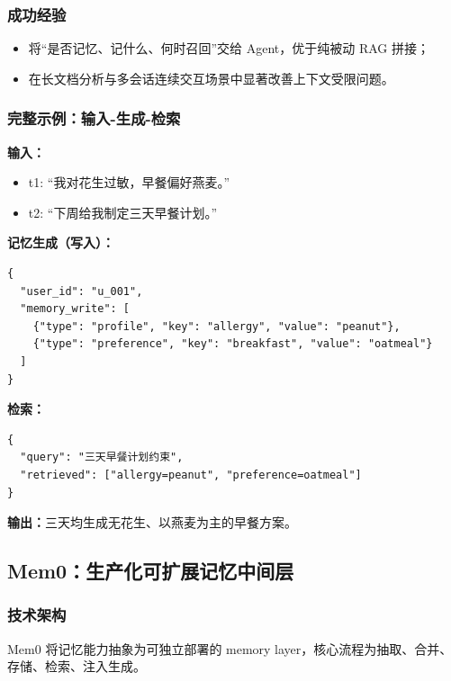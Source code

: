 \documentclass[12pt,a4paper]{article}
\begin{document}
\subsubsection{成功经验}
\begin{itemize}[leftmargin=2em]
  \item 将“是否记忆、记什么、何时召回”交给 Agent，优于纯被动 RAG 拼接；
  \item 在长文档分析与多会话连续交互场景中显著改善上下文受限问题\cite{memgpt2024}。
\end{itemize}

\subsubsection{完整示例：输入-生成-检索}
\textbf{输入：}
\begin{itemize}[leftmargin=2em]
  \item t1: “我对花生过敏，早餐偏好燕麦。”
  \item t2: “下周给我制定三天早餐计划。”
\end{itemize}

\textbf{记忆生成（写入）：}
\begin{verbatim}
{
  "user_id": "u_001",
  "memory_write": [
    {"type": "profile", "key": "allergy", "value": "peanut"},
    {"type": "preference", "key": "breakfast", "value": "oatmeal"}
  ]
}
\end{verbatim}

\textbf{检索：}
\begin{verbatim}
{
  "query": "三天早餐计划约束",
  "retrieved": ["allergy=peanut", "preference=oatmeal"]
}
\end{verbatim}

\textbf{输出：}三天均生成无花生、以燕麦为主的早餐方案。

\subsection{Mem0：生产化可扩展记忆中间层}
\subsubsection{技术架构}
Mem0 将记忆能力抽象为可独立部署的 memory layer，核心流程为抽取、合并、存储、检索、注入生成\cite{mem02025,mem0repo}。
\end{document}
